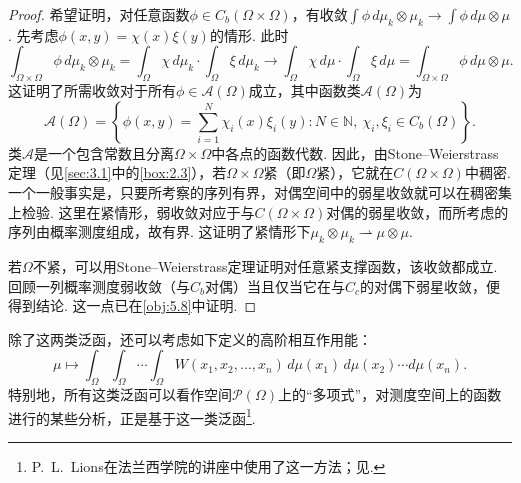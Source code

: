 \begin{proof}
希望证明，对任意函数$\phi\in C_b(\Omega\times\Omega)$，有收敛$\int\phi\,d\mu_k\otimes\mu_k\to\int\phi\,d\mu\otimes\mu$. 先考虑$\phi(x,y)=\chi(x)\xi(y)$的情形. 此时
\[
 \int_{\Omega\times\Omega}\phi\,d\mu_k\otimes\mu_k
 =\int_\Omega\chi\,d\mu_k\cdot\int_\Omega\xi\,d\mu_k
 \longrightarrow\int_\Omega\chi\,d\mu\cdot\int_\Omega\xi\,d\mu
 =\int_{\Omega\times\Omega}\phi\,d\mu\otimes\mu.
\]
这证明了所需收敛对于所有$\phi\in\mathscr A(\Omega)$成立，其中函数类$\mathscr A(\Omega)$为
\[
 \mathscr A(\Omega)=\left\{\phi(x,y)=\sum_{i=1}^N\chi_i(x)\xi_i(y):
          N\in\mathbb N,\ \chi_i,\xi_i\in C_b(\Omega)\right\}.
\]
类$\mathscr A$是一个包含常数且分离$\Omega\times\Omega$中各点的函数代数. 因此，由Stone--Weierstrass定理（见\autoref{sec:3.1}中的\autoref{box:2.3}），若$\Omega\times\Omega$紧（即$\Omega$紧），它就在$C(\Omega\times\Omega)$中稠密. 一个一般事实是，只要所考察的序列有界，对偶空间中的弱星收敛就可以在稠密集上检验. 这里在紧情形，弱收敛对应于与$C(\Omega\times\Omega)$对偶的弱星收敛，而所考虑的序列由概率测度组成，故有界. 这证明了紧情形下$\mu_k\otimes\mu_k\rightharpoonup\mu\otimes\mu$.

若$\Omega$不紧，可以用Stone--Weierstrass定理证明对任意紧支撑函数，该收敛都成立. 回顾一列概率测度弱收敛（与$C_b$对偶）当且仅当它在与$C_c$的对偶下弱星收敛，便得到结论. 这一点已在\autoref{obj:5.8}中证明.
\end{proof}
除了这两类泛函，还可以考虑如下定义的高阶相互作用能：
\[
 \mu\mapsto\int_\Omega\int_\Omega\cdots\int_\Omega
 W(x_1,x_2,\ldots,x_n)\,d\mu(x_1)\,d\mu(x_2)\cdots d\mu(x_n).
\]
特别地，所有这类泛函可以看作空间$\mathscr P(\Omega)$上的“多项式”，对测度空间上的函数进行的某些分析，正是基于这一类泛函\footnote{P.~L.~Lions在法兰西学院的讲座中使用了这一方法；见\cite{b211}.}.

